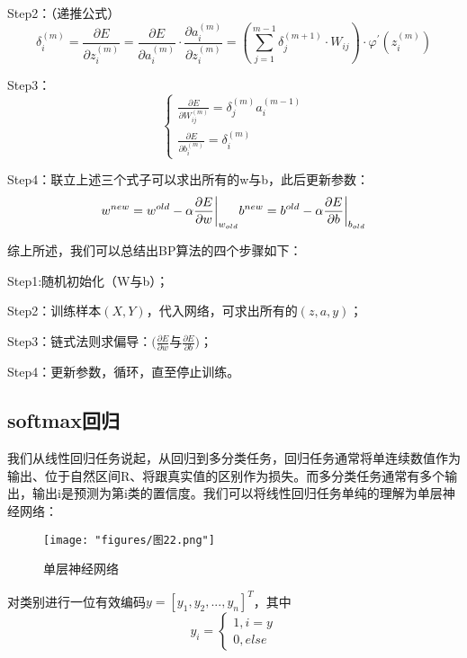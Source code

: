 Step2：（递推公式）
\begin{equation}\delta_i^{(m)}=\frac{\partial E}{\partial z_i^{(m)}}=\frac{\partial E}{\partial a_i^{(m)}}\cdot\frac{\partial a_i^{(m)}}{\partial z_i^{(m)}}=(\sum_{j=1}^{m-1}\delta_j^{(m+1)}\cdot W_{ij})\cdot\varphi^{\prime}(z_i^{(m)})\end{equation}

Step3：
\begin{equation}\begin{cases}\frac{\partial E}{\partial W_{ij}^{(m)}}=\delta_j^{(m)}a_i^{(m-1)}\\\frac{\partial E}{\partial b_i^{(m)}}=\delta_i^{(m)}\end{cases}\end{equation}

Step4：联立上述三个式子可以求出所有的w与b，此后更新参数：
\begin{equation}w^{new}=w^{old}-\alpha\frac{\partial E}{\partial w}\bigg|_{w_{old}}\\b^{new}=b^{old}-\alpha\frac{\partial E}{\partial b}\bigg|_{b_{old}}\end{equation}

综上所述，我们可以总结出BP算法的四个步骤如下：

Step1:随机初始化（W与b）；

Step2：训练样本$(X,Y)$，代入网络，可求出所有的$( z,a,y )$；

Step3：链式法则求偏导：$(\frac{\partial E}{\partial w}\text{与}\frac{\partial E}{\partial b}\text{)}$；

Step4：更新参数，循环，直至停止训练。
\subsection{softmax回归}
我们从线性回归任务说起，从回归到多分类任务，回归任务通常将单连续数值作为输出、位于自然区间R、将跟真实值的区别作为损失。而多分类任务通常有多个输出，输出i是预测为第i类的置信度。我们可以将线性回归任务单纯的理解为单层神经网络：
\begin{figure}[ht] %
	\centering
	\texttt{[image: "figures/图22.png"]} %
	\caption{单层神经网络} %
	\label{fig:example} %
\end{figure}

对类别进行一位有效编码$y=[y_1,y_2,...,y_n]^T$，其中
\begin{equation}y_i=\begin{cases}1,i=y\\0,else\end{cases}\end{equation}

